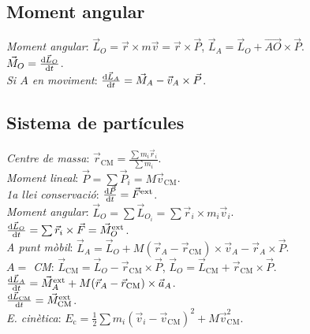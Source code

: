 \documentclass[10pt]{article}
\newcommand{\ci}{\textbullet\;}
\begin{document}
\begin{multicols}{3}
\subsection{Moment angular}
\emph{Moment angular}: $\vec{L}_O = \vec{r}\times m\vec{v} = \vec{r}\times\vec{P}$, $\vec{L}_A = \vec{L}_O + \vec{AO}\times\vec{P}$. \\
\ci $\vec{M}_O = \frac{\dif \vec{L}_O}{\dif t}$. \\
\emph{Si $A$ en moviment}: $\frac{\dif \vec{L}_A}{\dif t} = \vec{M}_A - \vec{v}_A\times\vec{P}$.

\subsection{Sistema de part\'icules}
\emph{Centre de massa}: $\vec{r}_{\text{CM}} = \frac{\sum m_i \vec{r}_i}{\sum m_i}$. \\
\emph{Moment lineal}: $\vec{P} = \sum \vec{P}_i = M\vec{v}_{\text{CM}}$. \\
\emph{1a llei conservaci\'o}: $\frac{\dif \vec{P}}{\dif t} = \vec{F}^{\text{ext}}$. \\
\emph{Moment angular}: $\vec{L}_O = \sum \vec{L}_{O_i} = \sum \vec{r}_i \times m_i\vec{v}_i$. \\
\ci $\frac{\dif \vec{L}_O}{\dif t} = \sum \vec{r}_i\times\vec{F} = \vec{M}_O^{\text{ext}}$. \\
\emph{A punt m\`obil}: $\vec{L}_A = \vec{L}_O + M(\vec{r}_A - \vec{r}_{\text{CM}}) \times \vec{v}_A - \vec{r}_A\times\vec{P}$. \\
\emph{$A =$ CM}: $\vec{L}_{\text{CM}} = \vec{L}_O - \vec{r}_{\text{CM}}\times\vec{P}$, $\vec{L}_O = \vec{L}_{\text{CM}} + \vec{r}_{\text{CM}}\times\vec{P}$. \\
\ci $\frac{\dif \vec{L}_A}{\dif t} = \vec{M}_A^{\text{ext}} + M(\vec{r}_A - \vec{r}_{\text{CM}})\times \vec{a}_A$. \\
\ci $\frac{\dif \vec{L}_{\text{CM}}}{\dif t} = \vec{M}_{\text{CM}}^{\text{ext}}$. \\
\emph{E. cin\`etica}: $E_{\text{c}} = \frac{1}{2} \sum m_i (\vec{v}_i - \vec{v}_{\text{CM}})^2 + M\vec{v}_{\text{CM}}^2$.


\end{multicols}
\end{document}
